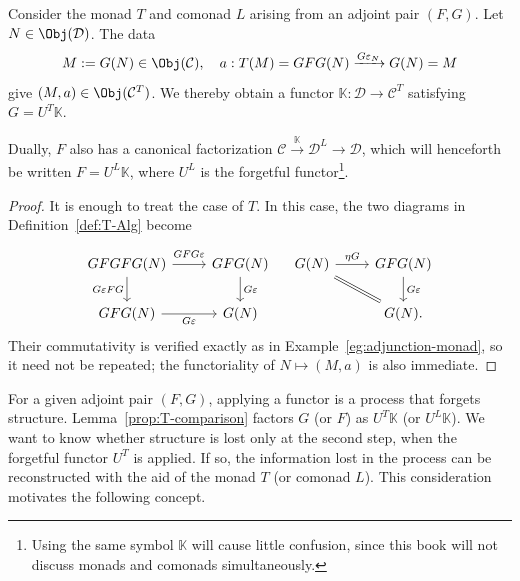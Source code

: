 
\hypertarget{o014.aljabr2.chapter7.beck-monadicity-b}{ }
\begin{lemma}\label{prop:T-comparison}
	Consider the monad $T$ and comonad $L$ arising from an adjoint pair $(F,G)$.
	Let $N\in\Obj(\mathcal{D})$. The data
	\[ M:=G(N)\in\Obj(\mathcal{C}), \quad
	 a:T(M)=GFG(N)\xrightarrow{G\varepsilon_N}G(N)=M \]
	give $(M,a)\in\Obj(\mathcal{C}^T)$. We thereby obtain a functor
	$\mathbb{K}:\mathcal{D}\to\mathcal{C}^T$ satisfying
	$G=U^T\mathbb{K}$.

	Dually, $F$ also has a canonical factorization
	$\mathcal{C}\xrightarrow{\mathbb{K}}\mathcal{D}^L\to\mathcal{D}$, which
	will henceforth be written $F=U^L\mathbb{K}$, where $U^L$ is the forgetful
	functor\footnote{Using the same symbol $\mathbb{K}$ will cause little
	confusion, since this book will not discuss monads and comonads
	simultaneously.}.
\end{lemma}
\begin{proof}
	It is enough to treat the case of $T$. In this case, the two diagrams in
	Definition~\ref{def:T-Alg} become
	\[\begin{tikzcd}
		GFGFG(N) \arrow[r, "GFG\varepsilon" inner sep=0.5em] \arrow[d, "{G\varepsilon FG}"'] & GFG(N) \arrow[d, "G\varepsilon"] \\
		GFG(N) \arrow[r, "G\varepsilon"'] & G(N)
	\end{tikzcd} \quad \begin{tikzcd}
		G(N) \arrow[r, "\eta G"] \arrow[equal, rd] & GFG(N) \arrow[d, "{G\varepsilon}"] \\
		& G(N).
	\end{tikzcd} \]
	Their commutativity is verified exactly as in
	Example~\ref{eg:adjunction-monad}, so it need not be repeated; the
	functoriality of $N\mapsto(M,a)$ is also immediate.
\end{proof}

For a given adjoint pair $(F,G)$, applying a functor is a process that forgets
structure. Lemma~\ref{prop:T-comparison} factors $G$ (or $F$) as
$U^T\mathbb{K}$ (or $U^L\mathbb{K}$). We want to know whether structure is
lost only at the second step, when the forgetful functor $U^T$ is applied. If
so, the information lost in the process can be reconstructed with the aid of
the monad $T$ (or comonad $L$). This consideration motivates the following
concept.

